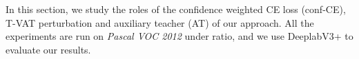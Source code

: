 \documentclass[10pt,twocolumn,letterpaper]{article}
\begin{document}
In this section, we study the roles of the confidence weighted CE loss (conf-CE), T-VAT perturbation and auxiliary teacher (AT) of our approach. All the experiments are run on  \textit{Pascal VOC 2012} under  ratio, and we use DeeplabV3+ to evaluate our results.  
\begin{table}[h]
\centering
\caption{\textbf{Ablation study} using the  labelled ratio on \textit{Pascal VOC 2012} under DeeplabV3+ architecture.}
\label{table:ablation}
\vspace{-15pt}
\end{table}
\end{document}
